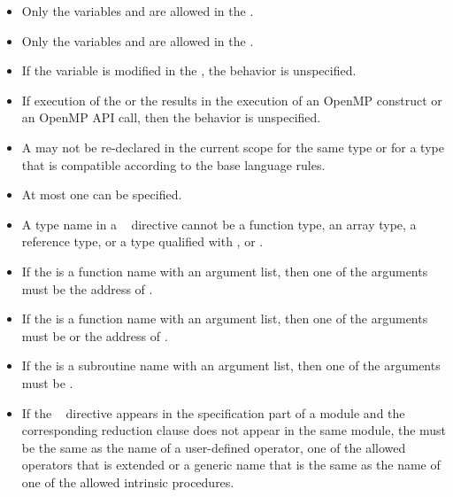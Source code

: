 \restrictions
\begin{itemize}
\item Only the variables  and  are allowed in the .

\item Only the variables  and  are allowed in the .

\item If the variable  is modified in the , the behavior is 
unspecified. 

\item If execution of the  or the  results in the execution of an 
OpenMP construct or an OpenMP API call, then the behavior is unspecified.

\item A  may not be re-declared in the current scope for the same type 
or for a type that is compatible according to the base language rules.

\item At most one  can be specified. 

\ccppspecificstart
\item A type name in a ~ directive cannot be a function type, an 
array type, a reference type, or a type qualified with ,  or 
. 
\ccppspecificend
\bigskip

\cspecificstart
\item If the  is a function name with an argument list, then one of the 
arguments must be the address of . 
\cspecificend
\bigskip

\cppspecificstart
\item If the  is a function name with an argument list, then one of the 
arguments must be  or the address of . 
\cppspecificend
\bigskip

\fortranspecificstart
\item If the  is a subroutine name with an argument list, then one of the 
arguments must be .

\item If the ~ directive appears in the specification part of a module and the corresponding reduction clause does not appear in the same module, the  must be the same as the name of a user-defined operator, one of the allowed operators that is extended or a generic name that is the same as the name of one of the allowed intrinsic procedures. 


\end{itemize}
